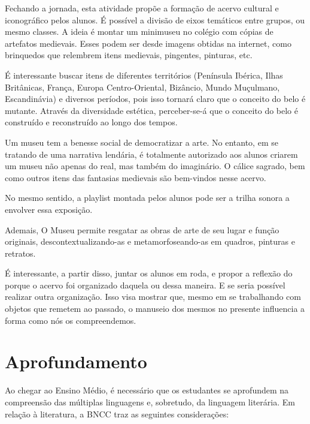 \documentclass[12pt]{extarticle}
\begin{document}
Fechando a jornada, esta atividade propõe a formação de
acervo cultural e iconográfico pelos alunos. É possível a divisão de
eixos temáticos entre grupos, ou mesmo classes. A ideia é montar um
minimuseu no colégio com cópias de artefatos medievais. Esses podem ser
desde imagens obtidas na internet, como brinquedos que relembrem itens
medievais, pingentes, pinturas, etc.

É interessante buscar itens de diferentes territórios (Península
Ibérica, Ilhas Britânicas, França, Europa Centro-Oriental, Bizâncio,
Mundo Muçulmano, Escandinávia) e diversos períodos, pois isso tornará
claro que o conceito do belo é mutante. Através da diversidade estética,
perceber-se-á que o conceito do belo é construído e reconstruído ao
longo dos tempos.

Um museu tem a benesse social de democratizar a arte. No entanto, em se
tratando de uma narrativa lendária, é totalmente autorizado aos alunos
criarem um museu não apenas do real, mas também do imaginário. O cálice
sagrado, bem como outros itens das fantasias medievais são bem-vindos
nesse acervo.

No mesmo sentido, a playlist montada pelos alunos pode ser a trilha
sonora a envolver essa exposição.

Ademais, O Museu permite resgatar as obras de arte de seu lugar e função
originais, descontextualizando-as e metamorfoseando-as em quadros,
pinturas e retratos.

É interessante, a partir disso, juntar os alunos em roda, e propor a
reflexão do porque o acervo foi organizado daquela ou dessa maneira. E
se seria possível realizar outra organização. Isso visa mostrar que,
mesmo em se trabalhando com objetos que remetem ao passado, o manuseio
dos mesmos no presente influencia a forma como nós os compreendemos.



\section{Aprofundamento}

Ao chegar ao Ensino Médio, é necessário que os estudantes se aprofundem
na compreensão das múltiplas linguagens e, sobretudo, da linguagem
literária. Em relação à literatura, a BNCC traz as seguintes
considerações:
\end{document}
